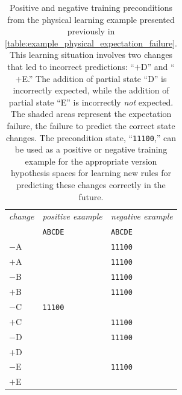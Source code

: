 \begin{table}
\centering
\begin{tabular}{p{1cm}|p{1.5cm}|p{1.5cm}|}
{\emph{change}}        & {\emph{positive example}}      & {\emph{negative example}}      \\
                       & {\tt{ABCDE}}                   & {\tt{ABCDE}}                   \\
\hline
$-$A                   &                                & {\tt{11100}}                   \\
$+$A                   &                                & {\tt{11100}}                   \\
$-$B                   &                                & {\tt{11100}}                   \\
$+$B                   &                                & {\tt{11100}}                   \\
$-$C                   & {\tt{11100}}                   &                                \\
$+$C                   &                                & {\tt{11100}}                   \\
$-$D                   &                                & {\tt{11100}}                   \\
\cellcolor{red!10}$+$D & \cellcolor{red!10}             & \cellcolor{red!10}{\tt{11100}} \\
$-$E                   &                                & {\tt{11100}}                   \\
\cellcolor{red!10}$+$E & \cellcolor{red!10}{\tt{11100}} & \cellcolor{red!10}             \\
\hline
\end{tabular}
\caption[Positive and negative training preconditions from the
  physical learning example presented previously in
  {\mbox{\autoref{table:example_physical_expectation_failure}}}.]{Positive
  and negative training preconditions from the physical learning
  example presented previously in
  {\mbox{\autoref{table:example_physical_expectation_failure}}}.  This
  learning situation involves two changes that led to incorrect
  predictions: ``$+$D'' and ``$+$E.''  The addition of partial state
  ``D'' is incorrectly expected, while the addition of partial state
  ``E'' is incorrectly {\emph{not}} expected.  The shaded areas
  represent the expectation failure, the failure to predict the
  correct state changes.  The precondition state, ``{\tt{11100}},''
  can be used as a positive or negative training example for the
  appropriate version hypothesis spaces for learning new rules for
  predicting these changes correctly in the future.}
\label{table:example_physical_transframe_rule_learning}
\end{table}
